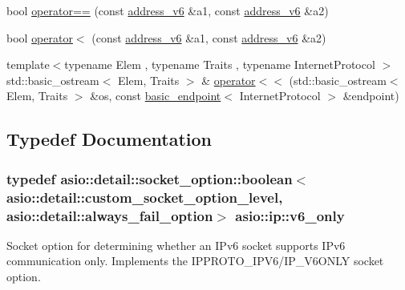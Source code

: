 \begin{DoxyCompactItemize}
\item 
bool \hyperlink{namespaceasio_1_1ip_aaee2f495d7b2c76c273e603d818bf62c}{operator==} (const \hyperlink{classasio_1_1ip_1_1address__v6}{address\+\_\+v6} \&a1, const \hyperlink{classasio_1_1ip_1_1address__v6}{address\+\_\+v6} \&a2)
\item 
bool \hyperlink{namespaceasio_1_1ip_a1c94815a0ef605c5e38938550157bd17}{operator$<$} (const \hyperlink{classasio_1_1ip_1_1address__v6}{address\+\_\+v6} \&a1, const \hyperlink{classasio_1_1ip_1_1address__v6}{address\+\_\+v6} \&a2)
\item 
{\footnotesize template$<$typename Elem , typename Traits , typename Internet\+Protocol $>$ }\\std\+::basic\+\_\+ostream$<$ Elem, Traits $>$ \& \hyperlink{namespaceasio_1_1ip_a6fec6eef3964f0d54d19876af1391eb7}{operator$<$$<$} (std\+::basic\+\_\+ostream$<$ Elem, Traits $>$ \&os, const \hyperlink{classasio_1_1ip_1_1basic__endpoint}{basic\+\_\+endpoint}$<$ Internet\+Protocol $>$ \&endpoint)
\end{DoxyCompactItemize}


\subsection{Typedef Documentation}
\hypertarget{namespaceasio_1_1ip_a4f0248e26261c7f45cde7360fb5e127c}{}
\subsubsection[{v6\+\_\+only}]{\setlength{\rightskip}{0pt plus 5cm}typedef {\bf asio\+::detail\+::socket\+\_\+option\+::boolean}$<$ {\bf asio\+::detail\+::custom\+\_\+socket\+\_\+option\+\_\+level}, {\bf asio\+::detail\+::always\+\_\+fail\+\_\+option}$>$ {\bf asio\+::ip\+::v6\+\_\+only}}\label{namespaceasio_1_1ip_a4f0248e26261c7f45cde7360fb5e127c}
Socket option for determining whether an I\+Pv6 socket supports I\+Pv6 communication only. Implements the I\+P\+P\+R\+O\+T\+O\+\_\+\+I\+P\+V6/\+I\+P\+\_\+\+V6\+O\+N\+L\+Y socket option.

